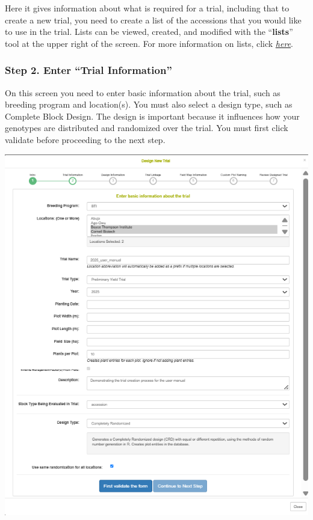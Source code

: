 \documentclass[
  12pt,
]{book}
\begin{document}
Here it gives information about what is required for a trial, including that to create a new trial, you need to create a list of the accessions that you would like to use in the trial. Lists can be viewed, created, and modified with the ``\textbf{lists}'' tool at the upper right of the screen. For more information on lists, click \protect\hyperlink{working-with-lists}{\emph{here}}.

\hypertarget{step-2.-enter-trial-information}{%
\subsubsection*{Step 2. Enter ``Trial Information''}\label{step-2.-enter-trial-information}}


On this screen you need to enter basic information about the trial, such as breeding program and location(s). You must also select a design type, such as Complete Block Design. The design is important because it influences how your genotypes are distributed and randomized over the trial. You must first click validate before proceeding to the next step.

\begin{center}\includegraphics[width=0.95\linewidth]{assets/images/trial_create_form_2} \end{center}
\end{document}
